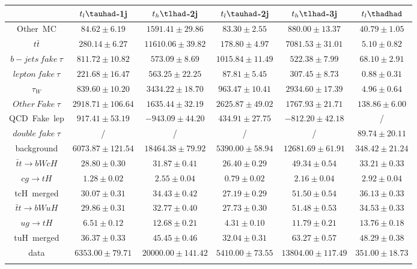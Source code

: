 \centering
\begin{tabular}{cccccc} \toprule\toprule
 & $t_{l}\tauhad$-1j & $t_{h}\tlhad$-2j & $t_{l}\tauhad$-2j & $t_{h}\tlhad$-3j & $t_{l}\thadhad$\\\midrule
\hspace{9mm}Other~MC & $84.62\pm6.19$ & $1591.41\pm29.86$ & $83.30\pm2.55$ & $880.00\pm13.37$ & $40.79\pm1.05$\\
\hspace{9mm}$t\bar{t}$ & $280.14\pm6.27$ & $11610.06\pm39.82$ & $178.80\pm4.97$ & $7081.53\pm31.01$ & $5.10\pm0.82$\\
\hspace{9mm}$b-jets~fake~\tau$ & $811.72\pm10.82$ & $573.09\pm8.69$ & $1015.84\pm11.49$ & $522.38\pm7.99$ & $68.10\pm2.91$\\
\hspace{9mm}$lepton~fake~\tau$ & $221.68\pm16.47$ & $563.25\pm22.25$ & $87.81\pm5.45$ & $307.45\pm8.73$ & $0.88\pm0.31$\\
\hspace{9mm}$\tau_{W}$ & $839.60\pm10.20$ & $3434.22\pm18.70$ & $963.47\pm10.41$ & $2934.60\pm17.39$ & $4.96\pm0.64$\\
\hspace{9mm}$Other~Fake~\tau$ & $2918.71\pm106.64$ & $1635.44\pm32.19$ & $2625.87\pm49.02$ & $1767.93\pm21.71$ & $138.86\pm6.00$\\
\hspace{9mm}QCD~Fake~lep & $917.41\pm53.19$ & $-943.09\pm44.20$ & $434.91\pm27.75$ & $-812.20\pm42.18$ &  /\\
\hspace{9mm}$double~fake~\tau$ &  / &  / &  / &  / & $89.74\pm20.11$\\
background & $6073.87\pm121.54$ & $18464.38\pm79.92$ & $5390.00\pm58.94$ & $12681.69\pm61.91$ & $348.42\pm21.24$\\\midrule
\hspace{9mm}$\bar{t}t\to bWcH$ & $28.80\pm0.30$ & $31.87\pm0.41$ & $26.40\pm0.29$ & $49.34\pm0.54$ & $33.21\pm0.33$\\
\hspace{9mm}$cg\to tH$ & $1.28\pm0.02$ & $2.55\pm0.04$ & $0.79\pm0.02$ & $2.16\pm0.04$ & $2.92\pm0.04$\\
tcH~merged & $30.07\pm0.31$ & $34.43\pm0.42$ & $27.19\pm0.29$ & $51.50\pm0.54$ & $36.13\pm0.33$\\
\hspace{9mm}$\bar{t}t\to bWuH$ & $29.86\pm0.31$ & $32.77\pm0.40$ & $27.73\pm0.30$ & $51.48\pm0.53$ & $34.53\pm0.33$\\
\hspace{9mm}$ug\to tH$ & $6.51\pm0.12$ & $12.68\pm0.21$ & $4.31\pm0.10$ & $11.79\pm0.21$ & $13.76\pm0.18$\\
tuH~merged & $36.37\pm0.33$ & $45.45\pm0.46$ & $32.04\pm0.31$ & $63.27\pm0.57$ & $48.29\pm0.38$\\\midrule
data & $6353.00\pm79.71$ & $20000.00\pm141.42$ & $5410.00\pm73.55$ & $13804.00\pm117.49$ & $351.00\pm18.73$\\
\bottomrule\bottomrule\\
\end{tabular}
